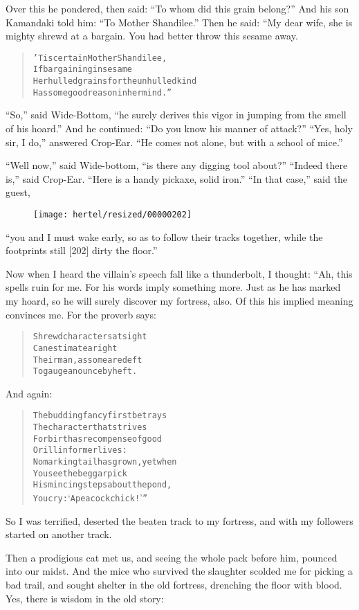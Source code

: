 \documentclass[article, twoside, 10pt]{memoir}
\renewenvironment{verbatim}{%
\begin{quote}%
\vskip -10pt%
\begin{alltt}\normalfont\small}{\end{alltt}%
\end{quote}%
\vskip -10pt
} %
\begin{document}
Over this he pondered, then said:
``To whom did this grain belong?'' And his son Kamandaki told him:
``To Mother Shandilee.'' Then he said: “My dear wife, she is mighty
shrewd at a bargain. You had better throw this sesame away.

\begin{verbatim}
'Tis certain Mother Shandilee,
If bargaining in sesame{\textemdash}
Her hulled grains for the unhulled kind{\textemdash}
Has some good reason in her mind.”
\end{verbatim}
``So,'' said Wide-Bottom,
``he surely derives this vigor in jumping from the smell of his hoard.''
And he continued: ``Do you know his manner of attack?''
``Yes, holy sir, I do,'' answered Crop-Ear.
``He comes not alone, but with a school of mice.''

``Well now,'' said Wide-bottom,
``is there any digging tool about?'' ``Indeed there is,'' said
Crop-Ear. ``Here is a handy pickaxe, solid iron.''
``In that case,'' said the guest,
\begin{figure}[p]\texttt{[image: hertel/resized/00000202]}\end{figure}``you and I must wake early, so as to follow their tracks together, while the footprints still [202] dirty the floor.''

Now when I heard the villain's speech fall like a thunderbolt, I
thought: “Ah, this spells ruin for me. For his words imply
something more. Just as he has marked my hoard, so he will surely
discover my fortress, also. Of this his implied meaning convinces
me. For the proverb says:

\begin{verbatim}
Shrewd characters at sight
Can estimate aright
Their man, as some are deft
To gauge an ounce by heft.
\end{verbatim}
And again:

\begin{verbatim}
The budding fancy first betrays
    The character that strives
For birth as recompense of good
    Or ill in former lives:
No marking tail has grown, yet when
    You see the beggar pick
His mincing steps about the pond,
    You cry: ‘A peacock chick!’”
\end{verbatim}
So I was terrified, deserted the beaten track to my fortress, and
with my followers started on another track.

Then a prodigious cat met us, and seeing the whole pack before him,
pounced into our midst. And the mice who survived the slaughter
scolded me for picking a bad trail, and sought shelter in the old
fortress, drenching the floor with blood. Yes, there is wisdom in
the old story:
\end{document}
